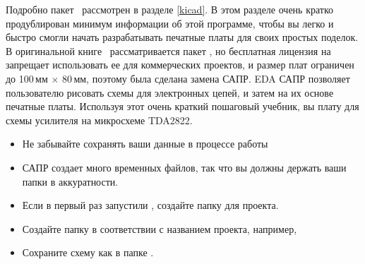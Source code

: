\secdown

Подробно пакет \ рассмотрен в разделе \ref{kicad}. В этом разделе
очень кратко продублирован минимум информации об этой программе, чтобы вы легко и быстро смогли начать
разрабатывать печатные платы для своих простых поделок. В оригинальной книге
\cite{bcollis}\ рассматривается пакет , но бесплатная лицензия на
 запрещает использовать ее для коммерческих проектов, и размер плат
ограничен до 100\,мм $\times$ 80\,мм, поэтому была сделана замена САПР. EDA САПР
позволяет пользователю рисовать схемы для электронных цепей, и затем на их
основе  печатные
платы. Используя этот очень краткий пошаговый учебник, вы
 плату для схемы усилителя
на микросхеме TDA2822.









\begin{itemize}
  \item 
Не забывайте сохранять ваши данные в процессе работы
  \item 
САПР создает много временных файлов, так что вы должны держать ваши папки в
аккуратности.
  \item 
Если в первый раз запустили , создайте папку для проекта.
  \item 
Создайте папку в соответствии с названием проекта, например, 
  \item 
Сохраните схему как  в папке .
\end{itemize}

\secup
